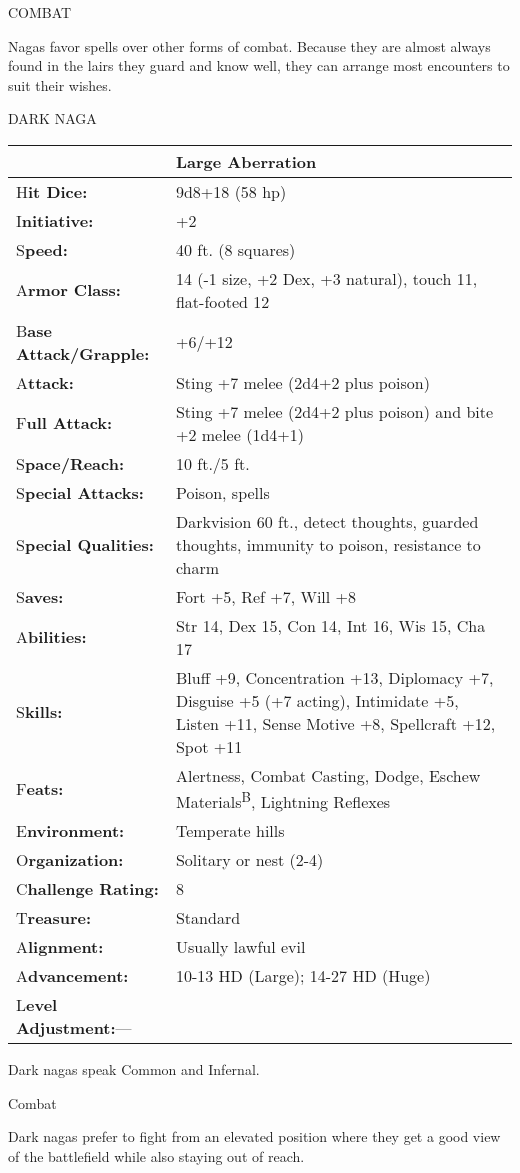 \documentclass{article}
\begin{document}
COMBAT

Nagas favor spells over other forms of combat. Because they are almost always found 
in the lairs they guard and know well, they can arrange most encounters to suit 
their wishes.

\vspace{12pt}
DARK NAGA

\begin{tabular}{|>{\raggedright}p{84pt}|>{\raggedright}p{242pt}|}
\hline
  & Large Aberration\tabularnewline
\hline
H\textbf{it Dice:} & 9d8+18 (58 hp)\tabularnewline
\hline
I\textbf{nitiative:} & +2\tabularnewline
\hline
S\textbf{peed:} & 40 ft. (8 squares)\tabularnewline
\hline
A\textbf{rmor Class:} & 14 (-1 size, +2 Dex, +3 natural), touch 11, flat-footed 
12\tabularnewline
\hline
B\textbf{ase Attack/Grapple:} & +6/+12\tabularnewline
\hline
A\textbf{ttack:} & Sting +7 melee (2d4+2 plus poison)\tabularnewline
\hline
F\textbf{ull Attack:} & Sting +7 melee (2d4+2 plus poison) and bite +2 melee (1d4+1)\tabularnewline
\hline
S\textbf{pace/Reach:} & 10 ft./5 ft.\tabularnewline
\hline
S\textbf{pecial Attacks:} & Poison, spells\tabularnewline
\hline
S\textbf{pecial Qualities:} & Darkvision 60 ft., detect thoughts, guarded thoughts, 
immunity to poison, resistance to charm\tabularnewline
\hline
S\textbf{aves:} & Fort +5, Ref +7, Will +8\tabularnewline
\hline
A\textbf{bilities:} & Str 14, Dex 15, Con 14, Int 16, Wis 15, Cha 17\tabularnewline
\hline
S\textbf{kills:} & Bluff +9, Concentration +13, Diplomacy +7, Disguise +5 (+7 acting), 
Intimidate +5, Listen +11, Sense Motive +8, Spellcraft +12, Spot +11\tabularnewline
\hline
F\textbf{eats:} & Alertness, Combat Casting, Dodge, Eschew Materials\textsuperscript{B}, 
Lightning Reflexes\tabularnewline
\hline
E\textbf{nvironment:} & Temperate hills\tabularnewline
\hline
O\textbf{rganization:} & Solitary or nest (2-4)\tabularnewline
\hline
C\textbf{hallenge Rating:} & 8\tabularnewline
\hline
T\textbf{reasure:} & Standard\tabularnewline
\hline
A\textbf{lignment:} & Usually lawful evil\tabularnewline
\hline
A\textbf{dvancement:} & 10-13 HD (Large); 14-27 HD (Huge)\tabularnewline
\hline
L\textbf{evel Adjustment:}--- & \tabularnewline
\hline
\end{tabular}

Dark nagas speak Common and Infernal.

Combat

Dark nagas prefer to fight from an elevated position where they get a good view 
of the battlefield while also staying out of reach.
\end{document}
